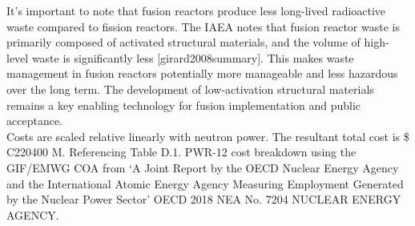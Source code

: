 It's important to note that fusion reactors produce less long-lived radioactive waste compared to fission reactors. The IAEA notes that fusion reactor waste is primarily composed of activated structural materials, and the volume of high-level waste is significantly less [girard2008summary].
This makes waste management in fusion reactors potentially more manageable and less hazardous over the long term. The development of low-activation structural materials remains a key enabling technology for fusion implementation and public acceptance.\\

Costs are scaled relative linearly with neutron power. The resultant total cost is \$ C220400 M. Referencing Table D.1. PWR-12 cost breakdown using the GIF/EMWG COA from `A Joint Report by the OECD Nuclear Energy Agency and the International Atomic Energy Agency Measuring Employment Generated by the Nuclear Power Sector'  OECD 2018 NEA No. 7204 NUCLEAR ENERGY AGENCY.
